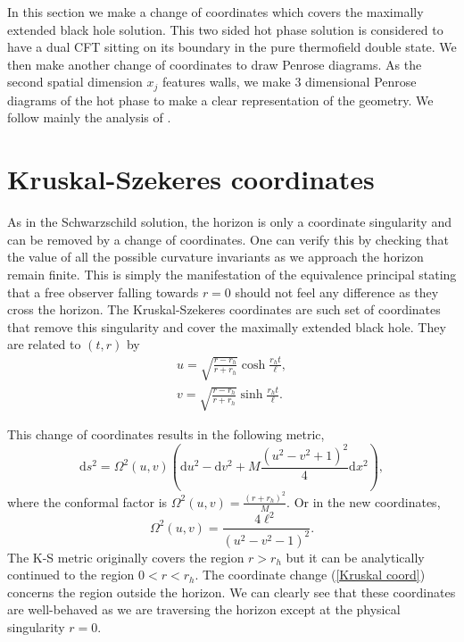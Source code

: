 In this section we make a change of coordinates which covers the maximally extended black hole solution. This two sided hot phase solution is considered to have a dual CFT sitting on its boundary in the pure thermofield double state. We then make another change of coordinates to draw Penrose diagrams. As the second spatial dimension $x_j$ features walls, we make $3$ dimensional Penrose diagrams of the hot phase to make a clear representation of the geometry. We follow mainly the analysis of \cite{Ba_ados_1993}.

\section{Kruskal-Szekeres coordinates}

As in the Schwarzschild solution, the horizon is only a coordinate singularity and can be removed by a change of coordinates. One can verify this by checking that the value of all the possible curvature invariants as we approach the horizon remain finite. This is simply the manifestation of the equivalence principal stating that a free observer falling towards $r=0$ should not feel any difference as they cross the horizon. The Kruskal-Szekeres coordinates are such set of coordinates that remove this singularity and cover the maximally extended black hole. They are related to $(t,r)$ by
\begin{subequations}
    \label{Kruskal coord}
    \begin{align}
        u = \sqrt{\frac{r-r_h}{r+r_h}}\cosh{\frac{r_ht}{\ell}},\label{kruskal u}\\
        v = \sqrt{\frac{r-r_h}{r+r_h}}\sinh{\frac{r_ht}{\ell}}.\label{kruskal v}
    \end{align}
\end{subequations}

This change of coordinates results in the following metric,
\begin{equation}\label{kruskal metric}
    \text{d}s^2=\Omega^2(u,v)\left(\text{d}u^2-\text{d}v^2+M\frac{\left(u^2-v^2+1\right)^2}{4}\text{d}x^2\right),
\end{equation}
where the conformal factor is $\Omega^2(u,v)=\frac{(r+r_h)^2}{M}$. Or in the new coordinates,
\begin{equation}
    \Omega^2(u,v)=\frac{4\ell^2}{\left(u^2-v^2-1\right)^2}.
\end{equation}
The K-S metric originally covers the region $r>r_h$ but it can be analytically continued to the region $0<r<r_h$. The coordinate change (\ref{Kruskal coord}) concerns the region outside the horizon. We can clearly see that these coordinates are well-behaved as we are traversing the horizon except at the physical singularity $r=0$. 

